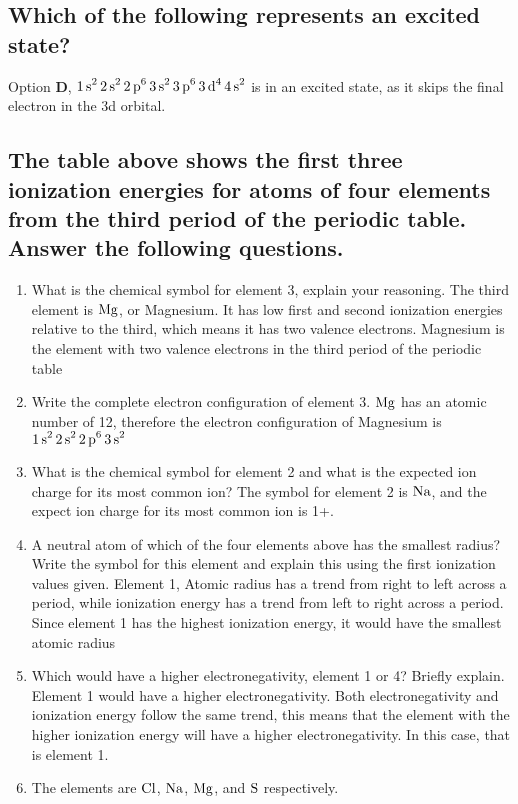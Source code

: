 \documentclass[11pt]{article}
\begin{document}
\subsection{Which of the following represents an excited state?}
\label{sec:orgd21551b}
Option \textbf{D}, \(\ce{1s^2 2s^2 2p^6 3s^2 3p^6 3d^4 4s^2}\) is in an excited state, as it skips the final electron in the 3d orbital.

\subsection{The table above shows the first three ionization energies for atoms of four elements from the third period of the periodic table. Answer the following questions.}
\label{sec:org91fe209}
\begin{enumerate}
\item What is the chemical symbol for element 3, explain your reasoning.
The third element is \(\ce{Mg}\), or Magnesium. It has low first and second ionization energies relative to the third, which means it has two valence electrons. Magnesium is the element with two valence electrons in the third period of the periodic table

\item Write the complete electron configuration of element 3.
\(\ce{Mg}\) has an atomic number of 12, therefore the electron configuration of Magnesium is \(\ce{1s^2 2s^2 2p^6 3s^2}\)

\item What is the chemical symbol for element 2 and what is the expected ion charge for its most common ion?
The symbol for element 2 is \(\ce{Na}\), and the expect ion charge for its most common ion is 1+.

\item A neutral atom of which of the four elements above has the smallest radius? Write the symbol for this element and explain this using the first ionization values given.
Element 1, Atomic radius has a trend from right to left across a period, while ionization energy has a trend from left to right across a period. Since element 1 has the highest ionization energy, it would have the smallest atomic radius

\item Which would have a higher electronegativity, element 1 or 4? Briefly explain.
Element 1 would have a higher electronegativity. Both electronegativity and ionization energy follow the same trend, this means that the element with the higher ionization energy will have a higher electronegativity. In this case, that is element 1.

\item The elements are \(\ce{Cl}\), \(\ce{Na}\), \(\ce{Mg}\), and \(\ce{S}\) respectively.
\end{enumerate}
\end{document}
